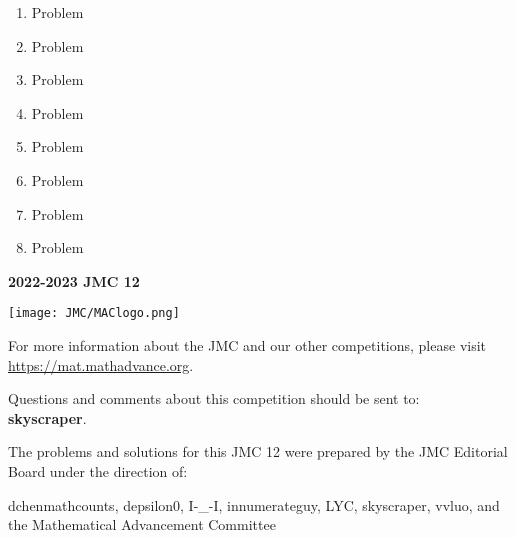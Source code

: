 \documentclass[10pt, twoside]{article}
\newcommand{\contestNumber}{12}
\newcommand{\theYear}{2022-2023}
\begin{document}
\begin{justify}
\begin{enumerate}[itemsep=3.76389mm]
\ans{}{}{}{}{}

\item Problem

\ans{}{}{}{}{}

\item Problem

\ans{}{}{}{}{}

\item Problem

\ans{}{}{}{}{}

\item Problem

\ans{}{}{}{}{}

\item Problem

\ans{}{}{}{}{}

\item Problem

\ans{}{}{}{}{}

\item Problem

\ans{}{}{}{}{}

\item Problem

\ans{}{}{}{}{}
\end{enumerate}

\newpage
\thispagestyle{empty}
\begin{center}\textsf{\textbf{\huge {\theYear} JMC {\contestNumber}}}\end{center}
\vspace{-6mm}
\begin{center} \noindent\hrulefill \end{center}
\vspace{-3mm}
\begin{center} \texttt{[image: JMC/MAClogo.png]}
\end{center}
\vspace{-5mm}
\begin{center}
For more information about the JMC and our other competitions, please visit \url{https://mat.mathadvance.org}.
\end{center}
\begin{center} Questions and comments about this competition should be sent to:  
\vspace{4mm}
\\ \textbf{skyscraper}.\end{center}
\begin{center}The problems and solutions for this JMC {\contestNumber} were prepared by the JMC Editorial Board under the direction of:\end{center}
\vspace{-3.5mm}
\begin{center}
dchenmathcounts, depsilon0, I-\_-I, innumerateguy, LYC, skyscraper, vvluo,
and the Mathematical Advancement Committee\end{center}
\end{justify}
\end{document}

